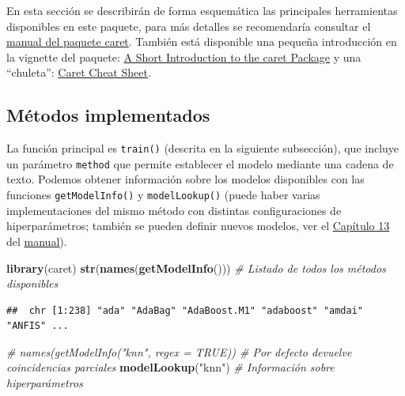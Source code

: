\documentclass[
  spanish,
]{book}
\newenvironment{Shaded}{\begin{snugshade}}{\end{snugshade}}
\newcommand{\CommentTok}[1]{\textcolor[rgb]{0.56,0.35,0.01}{\textit{#1}}}
\newcommand{\KeywordTok}[1]{\textcolor[rgb]{0.13,0.29,0.53}{\textbf{#1}}}
\newcommand{\NormalTok}[1]{#1}
\newcommand{\StringTok}[1]{\textcolor[rgb]{0.31,0.60,0.02}{#1}}
\theoremstyle{break}
\theoremstyle{definition}
\theoremstyle{definition}
\theoremstyle{definition}
\theoremstyle{remark}
\begin{document}
En esta sección se describirán de forma esquemática las principales herramientas disponibles en este paquete, para más detalles se recomendaría consultar el \href{https://topepo.github.io/caret}{manual del paquete caret}.
También está disponible una pequeña introducción en la vignette del paquete: \href{https://cran.r-project.org/web/packages/caret/vignettes/caret.html}{A Short Introduction to the caret Package} y una ``chuleta'': \href{https://raw.githubusercontent.com/rstudio/cheatsheets/master/caret.pdf}{Caret Cheat Sheet}.

\hypertarget{muxe9todos-implementados}{%
\subsection{Métodos implementados}\label{muxe9todos-implementados}}

La función principal es \texttt{train()} (descrita en la siguiente subsección), que incluye un parámetro \texttt{method} que permite establecer el modelo mediante una cadena de texto.
Podemos obtener información sobre los modelos disponibles con las funciones \texttt{getModelInfo()} y \texttt{modelLookup()} (puede haber varias implementaciones del mismo método con distintas configuraciones de hiperparámetros; también se pueden definir nuevos modelos, ver el \href{https://topepo.github.io/caret/using-your-own-model-in-train.html}{Capítulo 13} del \href{https://topepo.github.io/caret}{manual}).

\begin{Shaded}
\begin{Highlighting}[]
\KeywordTok{library}\NormalTok{(caret)}
\KeywordTok{str}\NormalTok{(}\KeywordTok{names}\NormalTok{(}\KeywordTok{getModelInfo}\NormalTok{())) }\CommentTok{# Listado de todos los métodos disponibles}
\end{Highlighting}
\end{Shaded}

\begin{verbatim}
##  chr [1:238] "ada" "AdaBag" "AdaBoost.M1" "adaboost" "amdai" "ANFIS" ...
\end{verbatim}

\begin{Shaded}
\begin{Highlighting}[]
\CommentTok{# names(getModelInfo("knn", regex = TRUE)) # Por defecto devuelve coincidencias parciales}
\KeywordTok{modelLookup}\NormalTok{(}\StringTok{"knn"}\NormalTok{)  }\CommentTok{# Información sobre hiperparámetros}
\end{Highlighting}
\end{Shaded}
\end{document}
